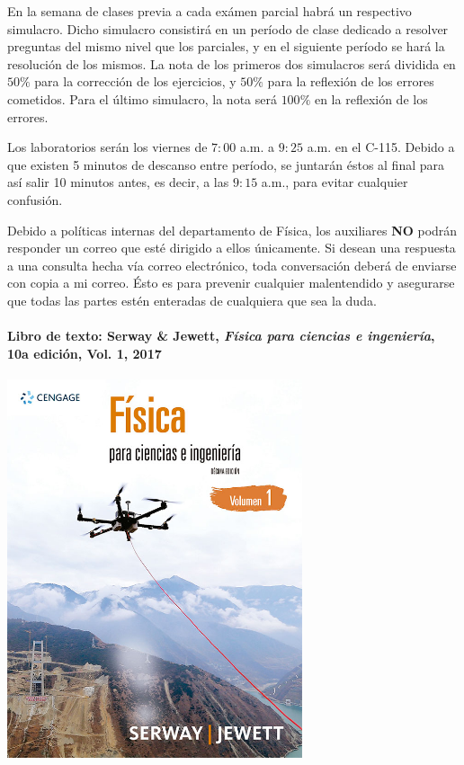 En la semana de clases previa a cada ex\'amen parcial habr\'a un respectivo simulacro. Dicho simulacro consistir\'a en un per\'iodo de clase dedicado a resolver preguntas del mismo nivel que los parciales, y en el siguiente per\'iodo se har\'a la resoluci\'on de los mismos. La nota de los primeros dos simulacros ser\'a dividida en $50\%$ para la correcci\'on de los ejercicios, y $50\%$ para la reflexi\'on de los errores cometidos. Para el \'ultimo simulacro, la nota ser\'a $100\%$ en la reflexi\'on de los errores.

Los laboratorios ser\'an los viernes de $7:00$ a.m. a $9:25$ a.m. en el C-115. Debido a que existen 5 minutos de descanso entre per\'iodo, se juntar\'an \'estos al final para as\'i salir 10 minutos antes, es decir, a las $9:15$ a.m., para evitar cualquier confusi\'on.

Debido a pol\'iticas internas del departamento de F\'isica, los auxiliares \textbf{NO} podr\'an responder un correo que est\'e dirigido a ellos \'unicamente. Si desean una respuesta a una consulta hecha v\'ia correo electr\'onico, toda conversaci\'on deber\'a de enviarse con copia a mi correo. \'Esto es para prevenir cualquier malentendido y asegurarse que todas las partes est\'en enteradas de cualquiera que sea la duda.

\paragraph{Libro de texto: Serway \& Jewett, \textit{F\'isica para ciencias e ingenier\'ia}, 10a edici\'on, Vol. 1, 2017}

\begin{center}
    \includegraphics[width=0.65\textwidth]{serwayjewett.JPG}
\end{center}

\newpage